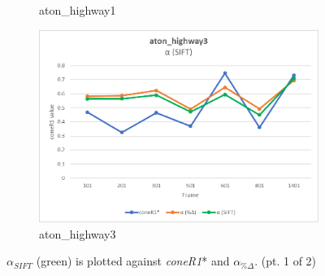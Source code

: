 \begin{appendices}
\begin{figure}
\begin{subfigure}{.45\linewidth}
  \caption{aton\_highway1}
\end{subfigure}
\hfill
\begin{subfigure}{.45\linewidth}
  \includegraphics[width=1\linewidth]{figures/appendix/highway3_sift.jpg}
  \caption{aton\_highway3}
\end{subfigure}

\caption{$\alpha_{SIFT}$ (green) is plotted against \textit{coneR1}* and $\alpha_{\%\Delta}$. (pt. 1 of 2)}
\end{figure}


\end{appendices}
